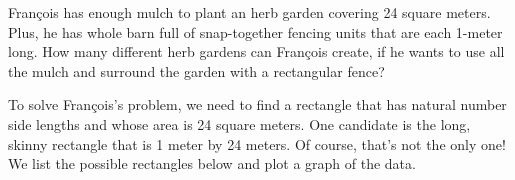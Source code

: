 
\begin{boxedexplore}
Fran\c{c}ois has enough mulch to plant an herb garden covering 24 square meters. Plus, he has whole barn full of snap-together fencing units that are each 1-meter long. How many different herb gardens can Fran\c{c}ois create, if he wants to use all the mulch and surround the garden with a rectangular fence?
\end{boxedexplore} %

To solve Fran\c{c}ois's problem, we need to find a rectangle that has natural number side lengths and whose area is 24 square meters. One candidate is the long, skinny rectangle that is 1 meter by 24 meters. Of course, that's not the only one! We list the possible rectangles below and plot a graph of the data.

